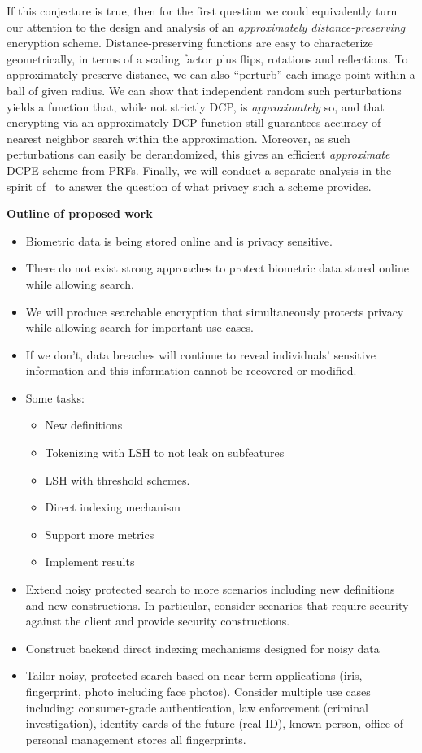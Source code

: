 \documentclass[11pt]{article}
\theoremstyle{remark}
\begin{document}
If this conjecture is true, then for the first question we could equivalently turn our attention to the design and analysis of  an \emph{approximately distance-preserving} encryption scheme. 
Distance-preserving functions are easy to characterize geometrically, in terms of a scaling factor plus flips, rotations and reflections.  To approximately preserve distance, we can also  ``perturb'' each image point within a ball of given radius.  
We can show that independent random such perturbations yields a function that, while not strictly DCP, is \emph{approximately} so, and that encrypting via an approximately DCP function still guarantees accuracy of nearest neighbor  search within the approximation.  Moreover, as such perturbations can easily be derandomized, this gives an efficient \emph{approximate} DCPE scheme from PRFs.  Finally, we will conduct a separate analysis in the spirit of~\cite{C:BolCheOne11} to answer the question of what privacy such a scheme provides.  

\textbf{Outline of proposed work}
\begin{itemize}
\item Biometric data is being stored online and is privacy sensitive.
\item There do not exist strong approaches to protect biometric data stored online while allowing search.
\item We will produce searchable encryption that simultaneously protects privacy while allowing search for important use cases.
\item If we don't, data breaches will continue to reveal individuals' sensitive information and this information cannot be recovered or modified.
\item Some tasks:
\begin{itemize}
\item New definitions
\item Tokenizing with LSH to not leak on subfeatures
\item LSH with threshold schemes.
\item Direct indexing mechanism
\item Support more metrics
\item Implement results
\end{itemize}
\item Extend noisy protected search to more scenarios including new definitions and new constructions.  In particular, consider scenarios that require security against the client and provide security constructions.
\item Construct backend direct indexing mechanisms designed for noisy data
\item Tailor noisy, protected search based on near-term applications (iris, fingerprint, photo including face photos).  Consider multiple use cases including: consumer-grade authentication, law enforcement (criminal investigation), identity cards of the future (real-ID), known person, office of personal management stores all fingerprints.
\end{itemize}
\end{document}
